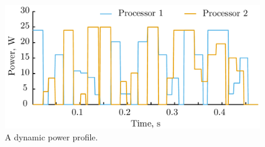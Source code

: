 \begin{figure}[t]
  \vspace{-1.0em}
  \centering
  \includegraphics[width=0.90\columnwidth]{include/assets/power.pdf}
  \caption{A dynamic power profile.}
  \vspace{-1.2em}
\end{figure}
